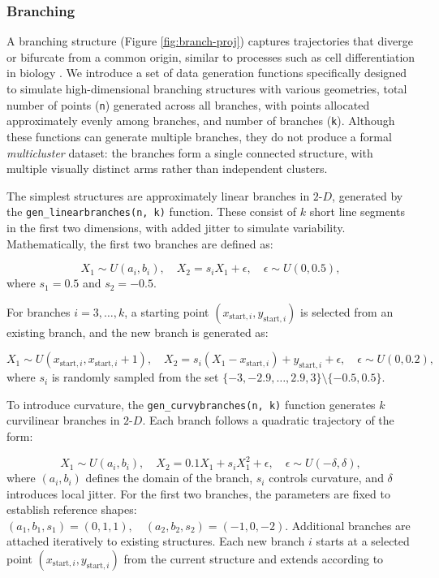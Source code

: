 \subsubsection{Branching}\label{branching}

A branching structure (Figure \ref{fig:branch-proj}) captures trajectories that diverge or bifurcate from a common origin, similar to processes such as cell differentiation in biology \citep{trapnell2014}. We introduce a set of data generation functions specifically designed to simulate high-dimensional branching structures with various geometries, total number of points (\texttt{n}) generated across all branches, with points allocated approximately evenly among branches, and number of branches (\texttt{k}). Although these functions can generate multiple branches, they do not produce a formal \emph{multicluster} dataset: the branches form a single connected structure, with multiple visually distinct arms rather than independent clusters.

The simplest structures are approximately linear branches in \(2\text{-}D\), generated by the \texttt{gen\_linearbranches(n,\ k)} function. These consist of \(k\) short line segments in the first two dimensions, with added jitter to simulate variability. Mathematically, the first two branches are defined as:

\[
X_1 \sim U(a_i, b_i), \quad
X_2 = s_i X_1 + \epsilon,
\quad
\epsilon \sim U(0, 0.5),
\]where \(s_1 = 0.5\) and \(s_2 = -0.5\).

For branches \(i = 3, \dots, k\), a starting point \((x_{\text{start},i}, y_{\text{start},i})\) is selected from an existing branch, and the new branch is generated as:

\[
X_1 \sim U(x_{\text{start},i}, x_{\text{start},i}+1), \quad
X_2 =
s_i (X_1 - x_{\text{start},i})
+ y_{\text{start},i}
+ \epsilon,
\quad
\epsilon \sim U(0, 0.2),
\]where \(s_i\) is randomly sampled from the set \(\{-3, -2.9, \dots, 2.9, 3\} \setminus \{-0.5, 0.5\}\).

To introduce curvature, the \texttt{gen\_curvybranches(n,\ k)} function generates \(k\) curvilinear branches in \(2\text{-}D\). Each branch follows a quadratic trajectory of the form:

\[
X_1 \sim U(a_i, b_i), \quad X_2 = 0.1 X_1 + s_i X_1^2 + \epsilon, \quad \epsilon \sim U(-\delta, \delta),
\]where \((a_i, b_i)\) defines the domain of the branch, \(s_i\) controls curvature, and \(\delta\) introduces local jitter. For the first two branches, the parameters are fixed to establish reference shapes: \((a_1,b_1,s_1) = (0,1,1), \quad (a_2,b_2,s_2) = (-1,0,-2)\). Additional branches are attached iteratively to existing structures. Each new branch \(i\) starts at a selected point \((x_{\text{start},i}, y_{\text{start},i})\) from the current structure and extends according to

